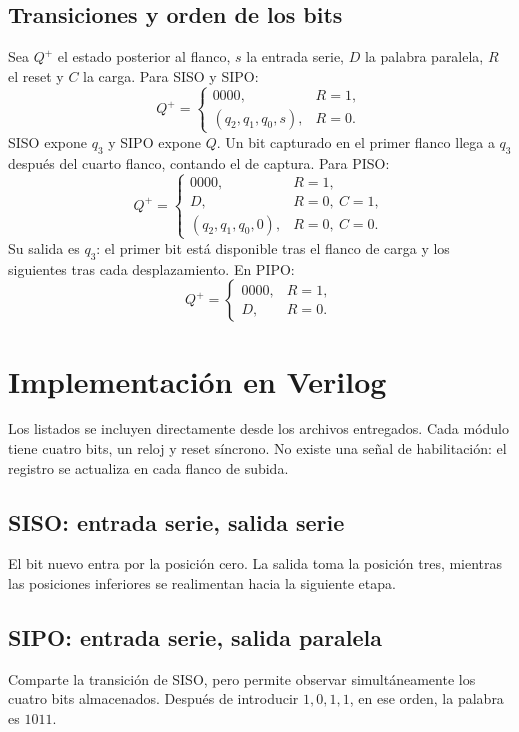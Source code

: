\documentclass{replab}
\begin{document}
\subsection{Transiciones y orden de los bits}
Sea $Q^+$ el estado posterior al flanco, $s$ la entrada serie, $D$ la palabra paralela, $R$ el reset y $C$ la carga. Para SISO y SIPO:
\begin{equation}
Q^+=\begin{cases}0000,&R=1,\\(q_2,q_1,q_0,s),&R=0.\end{cases}
\end{equation}
SISO expone $q_3$ y SIPO expone $Q$. Un bit capturado en el primer flanco llega a $q_3$ después del cuarto flanco, contando el de captura. Para PISO:
\begin{equation}
Q^+=\begin{cases}0000,&R=1,\\D,&R=0,\ C=1,\\(q_2,q_1,q_0,0),&R=0,\ C=0.\end{cases}
\end{equation}
Su salida es $q_3$: el primer bit está disponible tras el flanco de carga y los siguientes tras cada desplazamiento. En PIPO:
\begin{equation}
Q^+=\begin{cases}0000,&R=1,\\D,&R=0.\end{cases}
\end{equation}

\clearpage
\section{Implementación en Verilog}
Los listados se incluyen directamente desde los archivos entregados. Cada módulo tiene cuatro bits, un reloj y reset síncrono. No existe una señal de habilitación: el registro se actualiza en cada flanco de subida.

\subsection{SISO: entrada serie, salida serie}
El bit nuevo entra por la posición cero. La salida toma la posición tres, mientras las posiciones inferiores se realimentan hacia la siguiente etapa.


\subsection{SIPO: entrada serie, salida paralela}
Comparte la transición de SISO, pero permite observar simultáneamente los cuatro bits almacenados. Después de introducir $1,0,1,1$, en ese orden, la palabra es $1011$.

\end{document}
